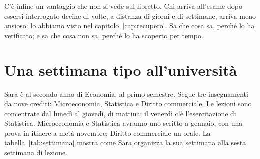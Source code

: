 C'è infine un vantaggio che non si vede sul libretto. Chi arriva
all'esame dopo essersi interrogato decine di volte, a distanza di
giorni e di settimane, arriva meno ansioso: lo abbiamo visto nel
capitolo~\ref{cap:recupero}. Sa che cosa sa, perché lo ha verificato;
e sa che cosa non sa, perché lo ha scoperto per tempo.

\section{Una settimana tipo all'università}

Sara è al secondo anno di Economia, al primo semestre. Segue tre
insegnamenti da nove crediti: Microeconomia, Statistica e Diritto
commerciale. Le lezioni sono concentrate dal lunedì al giovedì, di
mattina; il venerdì c'è l'esercitazione di Statistica. Microeconomia e
Statistica avranno uno scritto a gennaio, con una prova in itinere a
metà novembre; Diritto commerciale un orale. La tabella~\ref{tab:settimana}
mostra come Sara organizza la sua settimana alla sesta settimana di
lezione.

